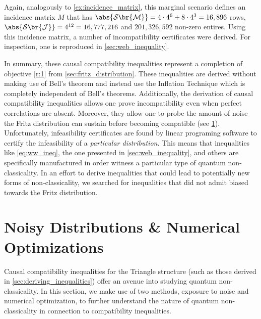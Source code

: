 \documentclass[aps, 10pt, english, twoside, pra, nofootinbib, tightenlines, longbibliography, superscriptaddress]{revtex4-1}
\renewcommand{\Events}[1]{\mathcal{S}\br{#1}} %
\begin{document}
    Again, analogously to \cref{ex:incidence_matrix}, this marginal scenario defines an incidence matrix $M$ that has $\abs{\Events{\mscenario}} = 4 \cdot 4^{6} + 8 \cdot 4^3 = 16,896$ rows, $\abs{\Events{\jointvar}} = 4^{12} = 16,777,216$ and $201,326,592$ non-zero entires. Using this incidence matrix, a number of incompatibility certificates were derived. For inspection, one is reproduced in \cref{sec:web_inequality}.

    In summary, these causal compatibility inequalities represent a completion of objective \cref{r:1} from \cref{sec:fritz_distribution}. These inequalities are derived without making use of Bell's theorem and instead use the Inflation Technique which is completely independent of Bell's theorems. Additionally, the derivation of causal compatibility inequalities allows one prove incompatibility even when perfect correlations are absent. Moreover, they allow one to probe the amount of noise the Fritz distribution can sustain before becoming compatible (see \cref{sec:violations_noise}). Unfortunately, infeasibility certificates are found by linear programing software to certify the infeasibility of a \textit{particular distribution}. This means that inequalities like \cref{eq:ww_ineq}, the one presented in \cref{sec:web_inequality}, and others are specifically manufactured in order witness a particular type of quantum non-classicality. In an effort to derive inequalities that could lead to potentially new forms of non-classicality, we searched for inequalities that did not admit biased towards the Fritz distribution.

    \section{Noisy Distributions \& Numerical Optimizations}
    \label{sec:violations_noise}
    Causal compatibility inequalities for the Triangle structure (such as those derived in \cref{sec:deriving_inequalities}) offer an avenue into studying quantum non-classicality. In this section, we make use of two methods, exposure to noise and numerical optimization, to further understand the nature of quantum non-classicality in connection to compatibility inequalities.
\end{document}
